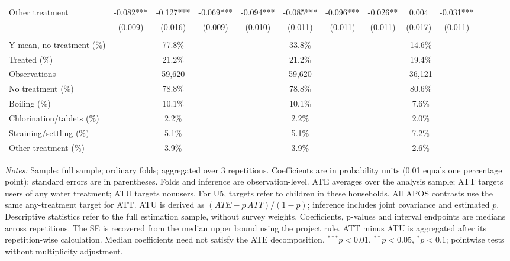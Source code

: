 \begin{table}[htbp]
\begin{adjustbox}{max width=\linewidth}
\begin{tabular}{lccccccccc}
Other treatment & -0.082*** & -0.127*** & -0.069*** & -0.094*** & -0.085*** & -0.096*** & -0.026** & 0.004 & -0.031*** \\
 & (0.009) & (0.016) & (0.009) & (0.010) & (0.011) & (0.011) & (0.011) & (0.017) & (0.011) \\
\addlinespace[6pt]
\multicolumn{10}{l}{\textit{Descriptive statistics and sample}} \\
Y mean, no treatment (\%) & \multicolumn{3}{c}{77.8\%} & \multicolumn{3}{c}{33.8\%} & \multicolumn{3}{c}{14.6\%} \\
Treated (\%) & \multicolumn{3}{c}{21.2\%} & \multicolumn{3}{c}{21.2\%} & \multicolumn{3}{c}{19.4\%} \\
Observations & \multicolumn{3}{c}{59,620} & \multicolumn{3}{c}{59,620} & \multicolumn{3}{c}{36,121} \\
No treatment (\%) & \multicolumn{3}{c}{78.8\%} & \multicolumn{3}{c}{78.8\%} & \multicolumn{3}{c}{80.6\%} \\
Boiling (\%) & \multicolumn{3}{c}{10.1\%} & \multicolumn{3}{c}{10.1\%} & \multicolumn{3}{c}{7.6\%} \\
Chlorination/tablets (\%) & \multicolumn{3}{c}{2.2\%} & \multicolumn{3}{c}{2.2\%} & \multicolumn{3}{c}{2.0\%} \\
Straining/settling (\%) & \multicolumn{3}{c}{5.1\%} & \multicolumn{3}{c}{5.1\%} & \multicolumn{3}{c}{7.2\%} \\
Other treatment (\%) & \multicolumn{3}{c}{3.9\%} & \multicolumn{3}{c}{3.9\%} & \multicolumn{3}{c}{2.6\%} \\
\hline\hline
\end{tabular}
\end{adjustbox}
\par\vspace{3pt}
\begin{minipage}{\linewidth}\scriptsize \textit{Notes:} Sample: full sample; ordinary folds; aggregated over 3 repetitions. Coefficients are in probability units (0.01 equals one percentage point); standard errors are in parentheses. Folds and inference are observation-level. ATE averages over the analysis sample; ATT targets users of any water treatment; ATU targets nonusers. For U5, targets refer to children in these households. All APOS contrasts use the same any-treatment target for ATT. ATU is derived as $(ATE-p\,ATT)/(1-p)$; inference includes joint covariance and estimated $p$. Descriptive statistics refer to the full estimation sample, without survey weights. Coefficients, p-values and interval endpoints are medians across repetitions. The SE is recovered from the median upper bound using the project rule. ATT minus ATU is aggregated after its repetition-wise calculation. Median coefficients need not satisfy the ATE decomposition. $^{***}p<0.01$, $^{**}p<0.05$, $^{*}p<0.1$; pointwise tests without multiplicity adjustment.\end{minipage}
\end{table}
